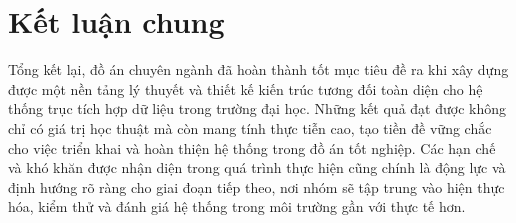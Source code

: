 \section{Kết luận chung}
Tổng kết lại, đồ án chuyên ngành đã hoàn thành tốt mục tiêu đề ra khi xây dựng được một nền tảng lý thuyết và thiết kế kiến trúc tương đối toàn diện cho hệ thống trục tích hợp dữ liệu trong trường đại học. Những kết quả đạt được không chỉ có giá trị học thuật mà còn mang tính thực tiễn cao, tạo tiền đề vững chắc cho việc triển khai và hoàn thiện hệ thống trong đồ án tốt nghiệp. Các hạn chế và khó khăn được nhận diện trong quá trình thực hiện cũng chính là động lực và định hướng rõ ràng cho giai đoạn tiếp theo, nơi nhóm sẽ tập trung vào hiện thực hóa, kiểm thử và đánh giá hệ thống trong môi trường gần với thực tế hơn.